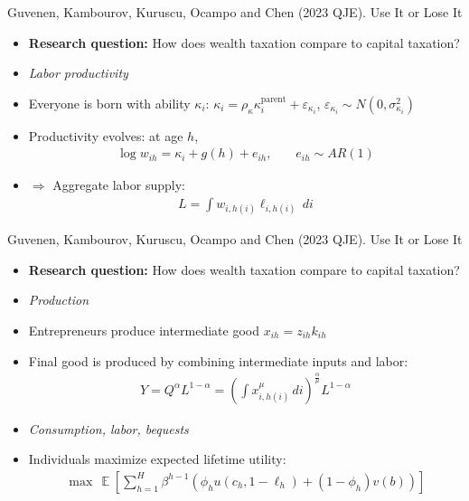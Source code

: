 \documentclass[aspectratio=169,compress,t,xcolor=table]{beamer}
\DeclareMathOperator{\E}{\mathbb{E}}                       %
\begin{document}
\begin{frame}{}
Guvenen, Kambourov, Kuruscu, Ocampo and Chen (2023 QJE). Use It or Lose It 
  \begin{itemize}
    \item {\color{MyStructure}\textbf{Research question:}} How does wealth taxation compare to capital taxation?
    \vfill\item \textit{Labor productivity}
    \vfill\item Everyone is born with ability \(\kappa_i\): \(\kappa_i = \rho_{\kappa} \kappa_i^{\text{parent}} + \varepsilon_{\kappa_i}\), \(\varepsilon_{\kappa_i} \sim N(0,\sigma_{\kappa_i}^2)\)
    \vfill\item Productivity evolves: at age \(h\),
    \begin{align*}
      \log w_{ih} = \kappa_i + g(h) + e_{ih}\text{,} \qquad e_{ih} \sim AR(1)
    \end{align*}
    \vfill\item \quad \(\Rightarrow\) Aggregate labor supply:
    \begin{align*}
      L = \int w_{i,h(i)} \ell_{i,h(i)} \, di
    \end{align*}
  \end{itemize}
\end{frame}

\begin{frame}{}
Guvenen, Kambourov, Kuruscu, Ocampo and Chen (2023 QJE). Use It or Lose It 
  \begin{itemize}
    \item {\color{MyStructure}\textbf{Research question:}} How does wealth taxation compare to capital taxation?
    \vfill\item \textit{Production}
    \vfill\item Entrepreneurs produce intermediate good \(x_{ih} = z_{ih} k_{ih}\)
    \vfill\item Final good is produced by combining intermediate inputs and labor:
    \begin{align*}
      Y = Q^{\alpha} L^{1-\alpha} = \left( \int x_{i,h(i)}^{\mu} \, di \right)^{\frac{\alpha}{\mu}} L^{1-\alpha}
    \end{align*}
    \vfill\item \textit{Consumption, labor, bequests}
    \vfill\item Individuals maximize expected lifetime utility:
    \begin{align*}
      \max \, \E \left[ \sum_{h=1}^H \beta^{h-1} (\phi_h u(c_h, 1-\ell_h) + (1-\phi_h) v(b)) \right]
    \end{align*}
  \end{itemize}
\end{frame}
\end{document}
